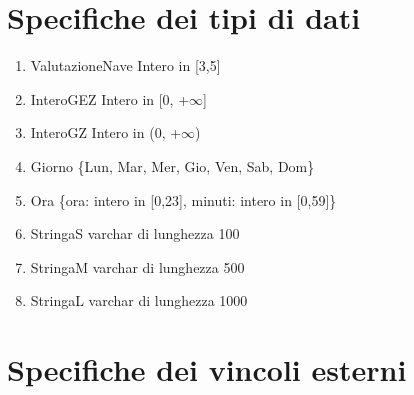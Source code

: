 \documentclass{article}
\begin{document}
\newpage
\section{Specifiche dei tipi di dati}

\begin{enumerate}
    \item ValutazioneNave Intero in [3,5]\label{sec:ValutazioneNave}
    \item InteroGEZ Intero in [0, +$\infty$]\label{sec:InteroGEZ}
    \item InteroGZ Intero in (0, +$\infty$)\label{sec:InteroGZ}
    \item Giorno \{Lun, Mar, Mer, Gio, Ven, Sab, Dom\}\label{sec:Giorno}
    \item Ora \{ora: intero in [0,23], minuti: intero in [0,59]\}\label{sec:Ora}
    \item StringaS varchar di lunghezza 100\label{sec:StringaS}
    \item StringaM varchar di lunghezza 500\label{sec:StringaM}
    \item StringaL varchar di lunghezza 1000\label{sec:StringaL}
\end{enumerate}


\newpage
\section{Specifiche dei vincoli esterni}
\end{document}

